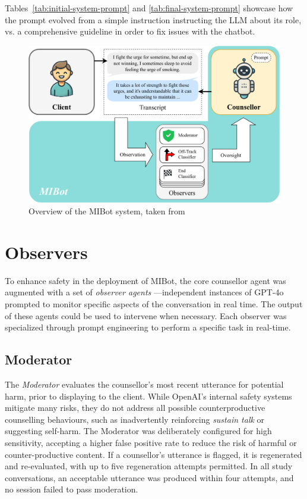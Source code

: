 Tables~\ref{tab:initial-system-prompt} and \ref{tab:final-system-prompt} showcase how the prompt evolved from a simple instruction instructing the LLM about its role, vs. a comprehensive guideline in order to fix issues with the chatbot.




\begin{figure}[ht]
  \centering
  \includegraphics[width=0.9\linewidth]{fig/sysdiag.pdf} 
  \caption{Overview of the MIBot system, taken from \citet{mahmood-etal-2025-fully}}
  \label{fig:sysdiag}
\end{figure}

\section{Observers}
\label{sec:observers}
To enhance safety in the deployment of MIBot, the core counsellor agent was augmented with a set of \textit{observer agents} ---independent instances of GPT-4o prompted to monitor specific aspects of the conversation in real time.  The output of these agents could be used to intervene when necessary. Each observer was specialized through prompt engineering to perform a specific task in real-time.

\subsection{Moderator}
The \textit{Moderator} evaluates the counsellor's most recent utterance for potential harm, prior to displaying to the client. While OpenAI's internal safety systems mitigate many risks, they do not address all possible counterproductive counselling behaviours, such as inadvertently reinforcing \emph{sustain talk} or suggesting self-harm. The Moderator was deliberately configured for high sensitivity, accepting a higher false positive rate to reduce the risk of harmful or counter-productive content. If a counsellor's utterance is flagged, it is regenerated and re-evaluated, with up to five regeneration attempts permitted. In all study conversations, an acceptable utterance was produced within four attempts, and no session failed to pass moderation.

